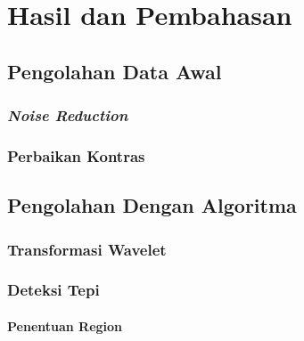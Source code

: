 \documentclass[laporan.tex]{subfiles}
\begin{document}
\chapter{Hasil dan Pembahasan}

\section{Pengolahan Data Awal}

\subsection{\emph{Noise Reduction}}

\subsection{Perbaikan Kontras}

\section{Pengolahan Dengan Algoritma}

\subsection{Transformasi Wavelet}

\subsection{Deteksi Tepi}

\subsubsection{Penentuan Region}
\end{document}
